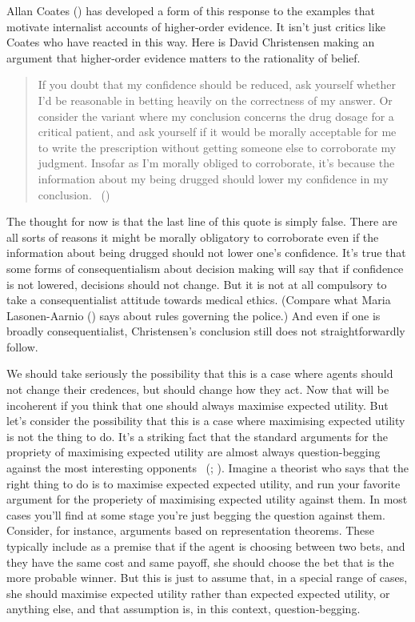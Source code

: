 \documentclass[
  10pt,
  letterpaper,
  twoside]{scrbook}
\begin{document}
Allan Coates () has developed a form of
this response to the examples that motivate internalist accounts of
higher-order evidence. It isn't just critics like Coates who have
reacted in this way. Here is David Christensen making an argument that
higher-order evidence matters to the rationality of belief.

\begin{quote}
If you doubt that my confidence should be reduced, ask yourself whether
I'd be reasonable in betting heavily on the correctness of my answer. Or
consider the variant where my conclusion concerns the drug dosage for a
critical patient, and ask yourself if it would be morally acceptable for
me to write the prescription without getting someone else to corroborate
my judgment. Insofar as I'm morally obliged to corroborate, it's because
the information about my being drugged should lower my confidence in my
conclusion. ~()
\end{quote}

The thought for now is that the last line of this quote is simply false.
There are all sorts of reasons it might be morally obligatory to
corroborate even if the information about being drugged should not lower
one's confidence. It's true that some forms of consequentialism about
decision making will say that if confidence is not lowered, decisions
should not change. But it is not at all compulsory to take a
consequentialist attitude towards medical ethics. (Compare what Maria
Lasonen-Aarnio () says
about rules governing the police.) And even if one is broadly
consequentialist, Christensen's conclusion still does not
straightforwardly follow.

We should take seriously the possibility that this is a case where
agents should not change their credences, but should change how they
act. Now that will be incoherent if you think that one should always
maximise expected utility. But let's consider the possibility that this
is a case where maximising expected utility is not the thing to do. It's
a striking fact that the standard arguments for the propriety of
maximising expected utility are almost always question-begging against
the most interesting opponents ~(;
). Imagine a theorist who
says that the right thing to do is to maximise expected expected
utility, and run your favorite argument for the properiety of maximising
expected utility against them. In most cases you'll find at some stage
you're just begging the question against them. Consider, for instance,
arguments based on representation theorems. These typically include as a
premise that if the agent is choosing between two bets, and they have
the same cost and same payoff, she should choose the bet that is the
more probable winner. But this is just to assume that, in a special
range of cases, she should maximise expected utility rather than
expected expected utility, or anything else, and that assumption is, in
this context, question-begging.
\end{document}
